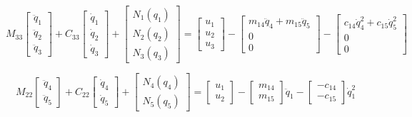 \[
M_{33}\left[\begin{array}{c}
\ddot{q}_{1}\\
\ddot{q}_{2}\\
\ddot{q}_{3}\end{array}\right]+C_{33}\left[\begin{array}{c}
\dot{q}_{1}\\
\dot{q}_{2}\\
\dot{q}_{3}\end{array}\right]+\left[\begin{array}{c}
N_{1}(q_{1})\\
N_{2}(q_{2})\\
N_{3}(q_{3})\end{array}\right]=\left[\begin{array}{c}
u_{1}\\
u_{2}\\
u_{3}\end{array}\right]-\left[\begin{array}{c}
m_{14}\ddot{q}_{4}+m_{15}\ddot{q}_{5}\\
0\\
0\end{array}\right]-\left[\begin{array}{c}
c_{14}\dot{q}_{4}^{2}+c_{15}\dot{q}_{5}^{2}\\
0\\
0\end{array}\right]
\]

\[
M_{22}\left[\begin{array}{c}
\ddot{q}_{4}\\
\ddot{q}_{5}\end{array}\right]+C_{22}\left[\begin{array}{c}
\dot{q}_{4}\\
\dot{q}_{5}\end{array}\right]+\left[\begin{array}{c}
N_{4}(q_{4})\\
N_{5}(q_{5})\end{array}\right]=\left[\begin{array}{c}
u_{1}\\
u_{2}\end{array}\right]-\left[\begin{array}{c}
m_{14}\\
m_{15}\end{array}\right]\ddot{q}_{1}-\left[\begin{array}{c}
-c_{14}\\
-c_{15}\end{array}\right]\dot{q}_{1}^{2}
\]

